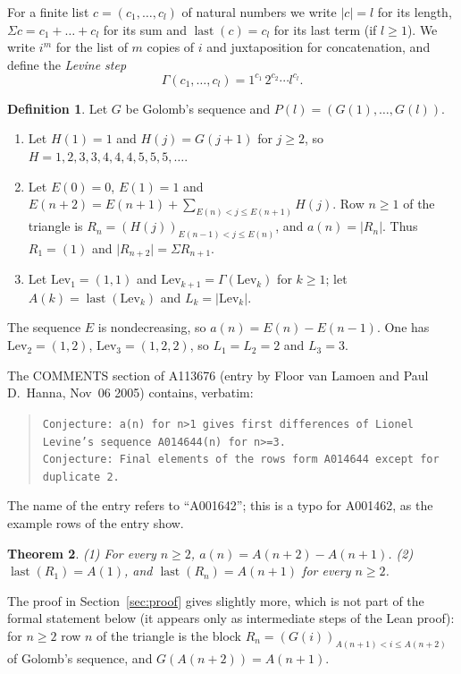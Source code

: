 \documentclass[11pt]{amsart}
\theoremstyle{plain}
\newtheorem{theorem}{Theorem}
\theoremstyle{definition}
\newtheorem{definition}[theorem]{Definition}
\newcommand{\Lev}{\mathrm{Lev}}
\newcommand{\last}{\operatorname{last}}
\newcommand{\len}[1]{\lvert #1\rvert}
\begin{document}
For a finite list $c=(c_1,\dots,c_l)$ of natural numbers we write $\len c=l$ for its length, $\Sigma c=c_1+\dots+c_l$ for its sum and $\last(c)=c_l$ for its last term (if $l\ge1$). We write $i^{m}$ for the list of $m$ copies of $i$ and juxtaposition for concatenation, and define the \emph{Levine step}
\[
  \Gamma(c_1,\dots,c_l) = 1^{c_1}\,2^{c_2}\cdots l^{c_l}.
\]

\begin{definition}\label{def:main}
Let $G$ be Golomb's sequence and $P(l)=(G(1),\dots,G(l))$.
\begin{enumerate}
\item Let $H(1)=1$ and $H(j)=G(j+1)$ for $j\ge2$, so $H=1,2,3,3,4,4,4,5,5,5,\dots$.
\item Let $E(0)=0$, $E(1)=1$ and $E(n+2)=E(n+1)+\sum_{E(n)<j\le E(n+1)}H(j)$. Row $n\ge1$ of the triangle is $R_n=(H(j))_{E(n-1)<j\le E(n)}$, and $a(n)=\len{R_n}$. Thus $R_1=(1)$ and $\len{R_{n+2}}=\Sigma R_{n+1}$.
\item Let $\Lev_1=(1,1)$ and $\Lev_{k+1}=\Gamma(\Lev_k)$ for $k\ge1$; let $A(k)=\last(\Lev_k)$ and $L_k=\len{\Lev_k}$.
\end{enumerate}
\end{definition}

The sequence $E$ is nondecreasing, so $a(n)=E(n)-E(n-1)$. One has $\Lev_2=(1,2)$, $\Lev_3=(1,2,2)$, so $L_1=L_2=2$ and $L_3=3$.

The COMMENTS section of A113676 \cite{A113676} (entry by Floor van Lamoen and Paul D.\ Hanna, Nov~06 2005) contains, verbatim:
\begin{quote}
{\small\texttt{Conjecture: a(n) for n>1 gives first differences of Lionel Levine's sequence A014644(n) for n>=3.}}\\
{\small\texttt{Conjecture: Final elements of the rows form A014644 except for duplicate 2.}}
\end{quote}
The name of the entry refers to ``A001642''; this is a typo for A001462, as the example rows of the entry show.

\begin{theorem}\label{thm:main}
\textup{(1)} For every $n\ge2$, $a(n)=A(n+2)-A(n+1)$.
\textup{(2)} $\last(R_1)=A(1)$, and $\last(R_n)=A(n+1)$ for every $n\ge2$.
\end{theorem}

The proof in Section~\ref{sec:proof} gives slightly more, which is not part of the formal statement below (it appears only as intermediate steps of the Lean proof): for $n\ge2$ row $n$ of the triangle is the block $R_n=(G(i))_{A(n+1)<i\le A(n+2)}$ of Golomb's sequence, and $G(A(n+2))=A(n+1)$.
\end{document}

